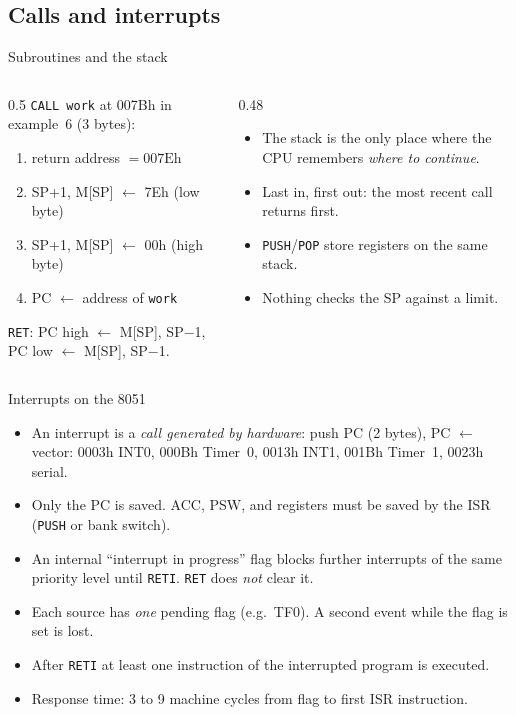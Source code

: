 \subsection{Calls and interrupts}
\begin{frame}{Subroutines and the stack}
  \begin{columns}[T]
    \begin{column}{0.5\textwidth}
      \texttt{CALL work} at 007Bh in example~6 (3 bytes):
      \begin{enumerate}
        \item return address $= 007\text{Eh}$
        \item SP+1, M[SP] $\leftarrow$ 7Eh (low byte)
        \item SP+1, M[SP] $\leftarrow$ 00h (high byte)
        \item PC $\leftarrow$ address of \texttt{work}
      \end{enumerate}
      \texttt{RET}: PC high $\leftarrow$ M[SP], SP$-$1, PC low $\leftarrow$ M[SP], SP$-$1.
    \end{column}
    \begin{column}{0.48\textwidth}
      \begin{itemize}
        \item The stack is the only place where the CPU remembers \emph{where to continue}.
        \item Last in, first out: the most recent call returns first.
        \item \texttt{PUSH}/\texttt{POP} store registers on the same stack.
        \item Nothing checks the SP against a limit.
      \end{itemize}
    \end{column}
  \end{columns}
\end{frame}

\begin{frame}{Interrupts on the 8051}
  \begin{itemize}
    \item An interrupt is a \emph{call generated by hardware}: push PC (2 bytes), PC $\leftarrow$ vector: 0003h INT0, 000Bh Timer~0, 0013h INT1, 001Bh Timer~1, 0023h serial.
    \item Only the PC is saved. ACC, PSW, and registers must be saved by the ISR (\texttt{PUSH} or bank switch).
    \item An internal ``interrupt in progress'' flag blocks further interrupts of the same priority level until \texttt{RETI}. \texttt{RET} does \emph{not} clear it.
    \item Each source has \emph{one} pending flag (e.g.\ TF0). A second event while the flag is set is lost.
    \item After \texttt{RETI} at least one instruction of the interrupted program is executed.
    \item Response time: 3 to 9 machine cycles from flag to first ISR instruction.
  \end{itemize}
\end{frame}

